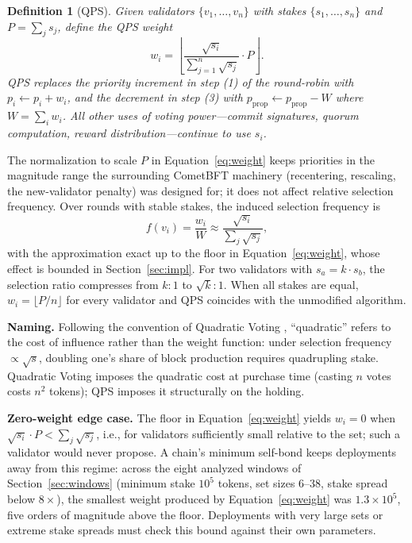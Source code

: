 \documentclass[11pt,a4paper]{article}
\newtheorem{definition}{Definition}
\begin{document}
\begin{definition}[QPS]
\label{def:qps}
Given validators $\{v_1, \ldots, v_n\}$ with stakes $\{s_1, \ldots, s_n\}$ and $P = \sum_j s_j$, define the QPS weight
\begin{equation}
\label{eq:weight}
w_i = \left\lfloor \frac{\sqrt{s_i}}{\sum_{j=1}^{n} \sqrt{s_j}} \cdot P \right\rfloor .
\end{equation}
QPS replaces the priority increment in step (1) of the round-robin with $p_i \leftarrow p_i + w_i$, and the decrement in step (3) with $p_{\text{prop}} \leftarrow p_{\text{prop}} - W$ where $W = \sum_i w_i$. All other uses of voting power---commit signatures, quorum computation, reward distribution---continue to use $s_i$.
\end{definition}

The normalization to scale $P$ in Equation~\eqref{eq:weight} keeps priorities in the magnitude range the surrounding CometBFT machinery (recentering, rescaling, the new-validator penalty) was designed for; it does not affect relative selection frequency. Over rounds with stable stakes, the induced selection frequency is
\begin{equation}
\label{eq:freq}
f(v_i) = \frac{w_i}{W} \approx \frac{\sqrt{s_i}}{\sum_j \sqrt{s_j}},
\end{equation}
with the approximation exact up to the floor in Equation~\eqref{eq:weight}, whose effect is bounded in Section~\ref{sec:impl}. For two validators with $s_a = k \cdot s_b$, the selection ratio compresses from $k:1$ to $\sqrt{k}:1$. When all stakes are equal, $w_i = \lfloor P/n \rfloor$ for every validator and QPS coincides with the unmodified algorithm.

\textbf{Naming.} Following the convention of Quadratic Voting \cite{qv}, ``quadratic'' refers to the cost of influence rather than the weight function: under selection frequency $\propto \sqrt{s}$, doubling one's share of block production requires quadrupling stake. Quadratic Voting imposes the quadratic cost at purchase time (casting $n$ votes costs $n^2$ tokens); QPS imposes it structurally on the holding.

\textbf{Zero-weight edge case.} The floor in Equation~\eqref{eq:weight} yields $w_i = 0$ when $\sqrt{s_i} \cdot P < \sum_j \sqrt{s_j}$, i.e., for validators sufficiently small relative to the set; such a validator would never propose. A chain's minimum self-bond keeps deployments away from this regime: across the eight analyzed windows of Section~\ref{sec:windows} (minimum stake $10^5$ tokens, set sizes 6--38, stake spread below $8\times$), the smallest weight produced by Equation~\eqref{eq:weight} was $1.3 \times 10^{5}$, five orders of magnitude above the floor. Deployments with very large sets or extreme stake spreads must check this bound against their own parameters.
\end{document}
